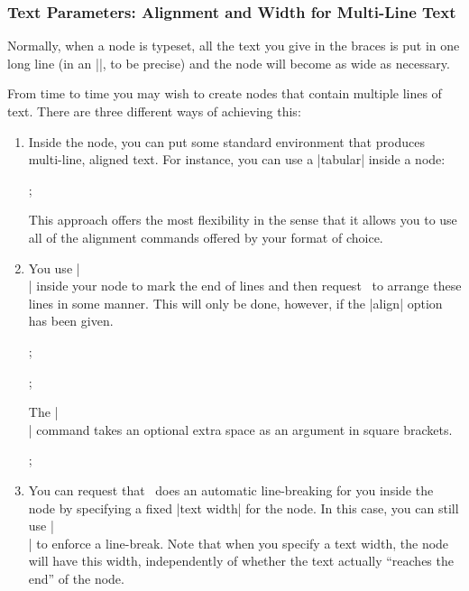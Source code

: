 \subsubsection{Text Parameters: Alignment and Width for Multi-Line Text}

Normally, when a node is typeset, all the text you give in the braces
is put in one long line (in an |\hbox|, to be precise) and the node
will become as wide as necessary.

From time to time you may wish to create nodes that contain multiple
lines of text. There are three different ways of achieving this:
\begin{enumerate}
\item Inside the node, you can put some standard environment that
  produces multi-line, aligned text. For instance, you can use a
  |{tabular}| inside a node:
\begin{codeexample}[]
\tikz {};
\end{codeexample}
  This approach offers the most flexibility in the sense that it
  allows you to use all of the alignment commands offered by your
  format of choice.
\item You use |\\| inside your node to mark the end of lines and then
  request \tikzname\ to arrange these lines in some manner. This will
  only be done, however, if the |align| option has been given.
\begin{codeexample}[]
\tikz[align=left] ;
\end{codeexample}
\begin{codeexample}[]
\tikz[align=center] ;
\end{codeexample}
  The |\\| command takes an optional extra space as an argument in square
  brackets.
\begin{codeexample}[]
\tikz {};
\end{codeexample}
\item You can request that \tikzname\ does an automatic line-breaking
  for you inside the node by specifying a fixed |text width| for the
  node. In this case, you can still use |\\| to enforce a
  line-break. Note that when you specify a text width, the node will
  have this width, independently of whether the text actually
  ``reaches the end'' of the node.
\end{enumerate}

